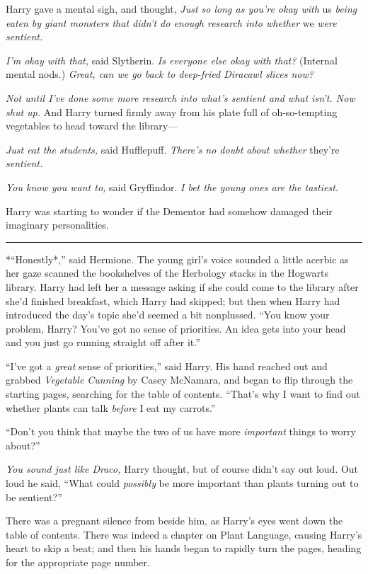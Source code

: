 Harry gave a mental sigh, and thought, \emph{Just so long as you're okay
with} us \emph{being eaten by giant monsters that didn't do enough
research into whether} we \emph{were sentient.}

\emph{I'm okay with that,} said Slytherin. \emph{Is everyone else okay
with that?} (Internal mental nods.) \emph{Great, can we go back to
deep-fried Diracawl slices now?}

\emph{Not until I've done some more research into what's sentient and
what isn't. Now shut up.} And Harry turned firmly away from his plate
full of oh-so-tempting vegetables to head toward the library---

\emph{Just eat the students,} said Hufflepuff. \emph{There's no doubt
about whether} they're \emph{sentient.}

\emph{You know you want to,} said Gryffindor. \emph{I bet the young ones
are the tastiest.}

Harry was starting to wonder if the Dementor had somehow damaged their
imaginary personalities.

\begin{center}\rule{3in}{0.4pt}\end{center}

*``Honestly*,'' said Hermione. The young girl's voice sounded a little
acerbic as her gaze scanned the bookshelves of the Herbology stacks in
the Hogwarts library. Harry had left her a message asking if she could
come to the library after she'd finished breakfast, which Harry had
skipped; but then when Harry had introduced the day's topic she'd seemed
a bit nonplussed. ``You know your problem, Harry? You've got no sense of
priorities. An idea gets into your head and you just go running straight
off after it.''

``I've got a \emph{great} sense of priorities,'' said Harry. His hand
reached out and grabbed \emph{Vegetable Cunning} by Casey McNamara, and
began to flip through the starting pages, searching for the table of
contents. ``That's why I want to find out whether plants can talk
\emph{before} I eat my carrots.''

``Don't you think that maybe the two of us have more \emph{important}
things to worry about?''

\emph{You sound just like Draco,} Harry thought, but of course didn't
say out loud. Out loud he said, ``What could \emph{possibly} be more
important than plants turning out to be sentient?''

There was a pregnant silence from beside him, as Harry's eyes went down
the table of contents. There was indeed a chapter on Plant Language,
causing Harry's heart to skip a beat; and then his hands began to
rapidly turn the pages, heading for the appropriate page number.

